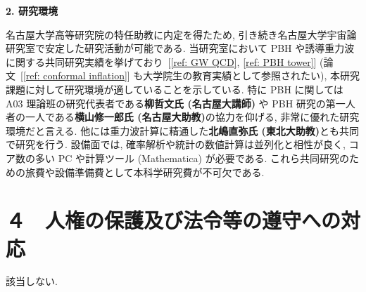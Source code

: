 \documentclass[11pt,a4paper,uplatex,dvipdfmx]{ujarticle} 		%
\newcommand{\研究課題名}{曲率ゆらぎの統計と原始ブラックホール量の精密対応}
\newcommand{\研究機関名}{名古屋大学}
\newcommand{\研究代表者氏名}{多田祐一郎}
\newcommand{\研究期間の最終元号年度}{4}  %
\renewcommand{\emph}[1]{{\sffamily\gtfamily\bfseries #1}}
\begin{document}
\begin{mdframed}[roundcorner=0.5zw,
	innertopmargin=0.8zw,innerbottommargin=0.8zw,
	linecolor=black!50,linewidth=0.2zw,
	backgroundcolor=black!10]
	{\bfseries\gtfamily\sffamily\large 2. 研究環境}
\end{mdframed}

\noindent
名古屋大学高等研究院の特任助教に内定を得たため, 引き続き名古屋大学宇宙論研究室で安定した研究活動が可能である.
当研究室において PBH や誘導重力波に関する共同研究実績を挙げており~[\ref{ref: GW QCD}, \ref{ref: PBH tower}] (論文~[\ref{ref: conformal inflation}] も大学院生の教育実績として参照されたい),
本研究課題に対して研究環境が適していることを示している.
特に PBH に関しては A03 理論班の研究代表者である\emph{柳哲文氏 (名古屋大講師)} や PBH 研究の第一人者の一人である\emph{横山修一郎氏 (名古屋大助教)}の協力を仰げる, 
非常に優れた研究環境だと言える.
他には重力波計算に精通した\emph{北嶋直弥氏 (東北大助教)}とも共同で研究を行う.
設備面では, 確率解析や統計の数値計算は並列化と相性が良く, コア数の多い PC や計算ツール (Mathematica) が必要である.
これら共同研究のための旅費や設備準備費として本科学研究費が不可欠である.


	
	




\section{４　人権の保護及び法令等の遵守への対応}


\noindent
該当しない.
	



\end{document}
